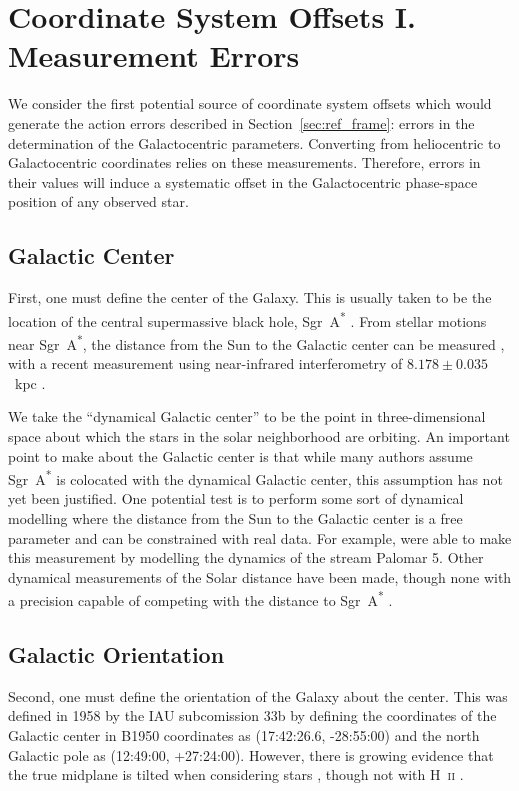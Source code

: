 \documentclass[twocolumn]{aastex62}
\begin{document}
\section{Coordinate System Offsets I. Measurement Errors} \label{sec:mes_err}
We consider the first potential source of coordinate system offsets which
would generate the action errors described in Section~\ref{sec:ref_frame}:
errors in the determination of the Galactocentric parameters. Converting from
heliocentric to Galactocentric coordinates relies on these measurements.
Therefore, errors in their values will induce a systematic offset in the
Galactocentric phase-space position of any observed star.

\subsection{Galactic Center}
First, one must define the center of the Galaxy. This is usually taken to be
the location of the central supermassive black hole, Sgr~A\textsuperscript{*}
\citep[e.g.][]{2004ApJ...616..872R}. From stellar motions near
Sgr~A\textsuperscript{*}, the distance from the Sun to the Galactic center can
be measured \citep{2009ApJ...692.1075G, 2018AA...615L..15G}, with a recent
measurement using near-infrared interferometry of $8.178 \pm 0.035$~kpc
\citep{2019arXiv190405721A}.

We take the ``dynamical Galactic center'' to be the point in three-dimensional
space about which the stars in the solar neighborhood are orbiting. An
important point to make about the Galactic center is that while many authors
assume Sgr~A\textsuperscript{*} is colocated with the dynamical Galactic
center, this assumption has not yet been justified. One potential test is to
perform some sort of dynamical modelling where the distance from the Sun to
the Galactic center is a free parameter and can be constrained with real data.
For example, \citet{2015ApJ...803...80K} were able to make this measurement by
modelling the dynamics of the stream Palomar 5. Other dynamical measurements
of the Solar distance have been made, though none with a precision capable of
competing with the distance to Sgr~A\textsuperscript{*}
\citep{1981gask.book.....M, 2011PASJ...63..867S, 2012MNRAS.427..274S,
2013AstL...39...95B, 2013IAUS..289..444Z}.

\subsection{Galactic Orientation}
Second, one must define the orientation of the Galaxy about the center. This
was defined in 1958 by the IAU subcomission 33b \citep{1960MNRAS.121..123B} by
defining the coordinates of the Galactic center in B1950 coordinates as
(17:42:26.6, -28:55:00) and the north Galactic pole as (12:49:00, +27:24:00).
However, there is growing evidence that the true midplane is tilted when
considering stars \citep{2014ApJ...797...53G, 2016ARAA..54..529B}, though not
with H~\textsc{ii} \citep{2019ApJ...871..145A}.
\end{document}
